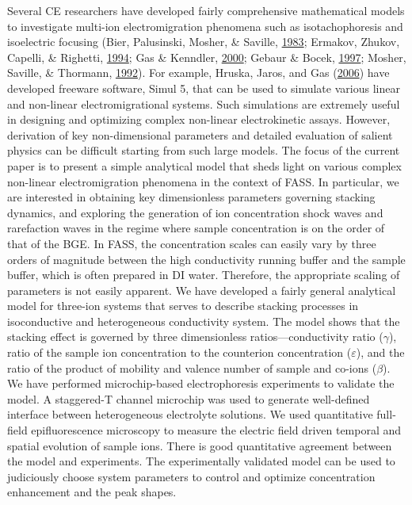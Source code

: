 \documentclass[lineno,authoryear]{FLO_v1}%
\theoremstyle{definition}
\begin{document}
Several CE researchers have developed fairly comprehensive
mathematical models to investigate multi-ion
electromigration phenomena such as isotachophoresis and
isoelectric focusing (Bier, Palusinski, Mosher, \& Saville, \hyperlink{bib3}{1983}; Ermakov, Zhukov, Capelli,
\& Righetti, \hyperlink{bib7}{1994}; Gas \&
Kenndler, \hyperlink{bib9}{2000}; Gebaur \& Bocek,
\hyperlink{bib10}{1997}; Mosher, Saville, \& Thormann,
\hyperlink{bib19}{1992}). For example, Hruska, Jaros, and
Gas (\hyperlink{bib11}{2006}) have developed freeware
software, Simul 5, that can be used to simulate various
linear and non-linear electromigrational systems. Such
simulations are extremely useful in designing and
optimizing complex non-linear electrokinetic assays.
However, derivation of key non-dimensional parameters and
detailed evaluation of salient physics can be difficult
starting from such large models. The focus of the current
paper is to present a simple analytical model that sheds
light on various complex non-linear electromigration
phenomena in the context of FASS. In particular, we are
interested in obtaining key dimensionless parameters
governing stacking dynamics, and exploring the generation
of ion concentration shock waves and rarefaction waves in
the regime where sample concentration is on the order of
that of the BGE. In FASS, the concentration scales can
easily vary by three orders of magnitude between the high
conductivity running buffer and the sample buffer, which is
often prepared in DI water. Therefore, the appropriate
scaling of parameters is not easily apparent. We have
developed a fairly general analytical model for three-ion
systems that serves to describe stacking processes in
isoconductive and heterogeneous conductivity system. The
model shows that the stacking effect is governed by three
dimensionless ratios---conductivity ratio ($\gamma$), ratio
of the sample ion concentration to the counterion
concentration ($\varepsilon$), and the ratio of the product
of mobility and valence number of sample and co-ions
($\beta$). We have performed microchip-based
electrophoresis experiments to validate the model. A
staggered-T channel microchip was used to generate
well-defined interface between heterogeneous electrolyte
solutions. We used quantitative full-field epifluorescence
microscopy to measure the electric field driven temporal
and spatial evolution of sample ions. There is good
quantitative agreement between the model and experiments.
The experimentally validated model can be used to
judiciously choose system parameters to control and
optimize concentration enhancement and the peak shapes.
\end{document}
